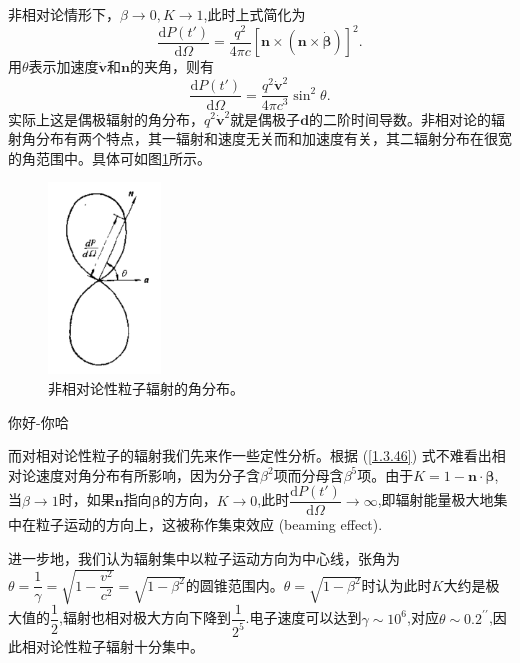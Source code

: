 \documentclass[../天体物理基础.tex]{subfiles}
\begin{document}
非相对论情形下，$\beta\to0,K\to1$,此时上式简化为
\begin{equation}
\frac{\mathrm{d}P\left(t'\right)}{\mathrm{d}\Omega}=\frac{q^{2}}{4\pi c}\left[\boldsymbol{n}\times\left(\boldsymbol{n}\times\dot{\boldsymbol{\beta}}\right)\right]^{2}.
\end{equation}
用$\theta$表示加速度$\dot{\boldsymbol{v}}$和$\boldsymbol{n}$的夹角，则有
\begin{equation}
\frac{\mathrm{d}P\left(t'\right)}{\mathrm{d}\Omega}=\frac{q^{2}\dot{\boldsymbol{v}}^{2}}{4\pi c^{3}}\sin^{2}\theta.
\end{equation}
实际上这是偶极辐射的角分布，$q^{2}\dot{\boldsymbol{v}}^{2}$就是偶极子$\boldsymbol{d}$的二阶时间导数。非相对论的辐射角分布有两个特点，其一辐射和速度无关而和加速度有关，其二辐射分布在很宽的角范围中。具体可如图\ref{非相对论性粒子辐射的角分布。}所示。
\begin{figure}[!htbp]
\centering
\includegraphics[width=3cm]{figures/figure1_5.png}
\captionsetup{justification=raggedright, singlelinecheck=false}
\caption{非相对论性粒子辐射的角分布。}
\label{非相对论性粒子辐射的角分布。}
\end{figure}

你好{}-{}你哈

而对相对论性粒子的辐射我们先来作一些定性分析。根据 (\ref{1.3.46}) 式不难看出相对论速度对角分布有所影响，因为分子含$\beta^{2}$项而分母含$\beta^{5}$项。由于$K=1-\boldsymbol{n}\cdot\boldsymbol{\beta}$,当$\beta\to1$时，如果$\boldsymbol{n}$指向$\boldsymbol{\beta}$的方向，$K\to0$,此时$\dfrac{\mathrm{d}P\left(t'\right)}{\mathrm{d}\Omega}\to\infty$,即辐射能量极大地集中在粒子运动的方向上，这被称作集束效应 (beaming effect).

进一步地，我们认为辐射集中以粒子运动方向为中心线，张角为$\theta=\dfrac{1}{\gamma}=\sqrt{1-\dfrac{v^{2}}{c^{2}}}=\sqrt{1-\beta^{2}}$的圆锥范围内。$\theta=\sqrt{1-\beta^{2}}$时认为此时$K$大约是极大值的$\dfrac{1}{2}$,辐射也相对极大方向下降到$\dfrac{1}{2^{5}}$.电子速度可以达到$\gamma\sim10^{6}$,对应$\theta\sim0.2^{\prime\prime}$,因此相对论性粒子辐射十分集中。
\end{document}
